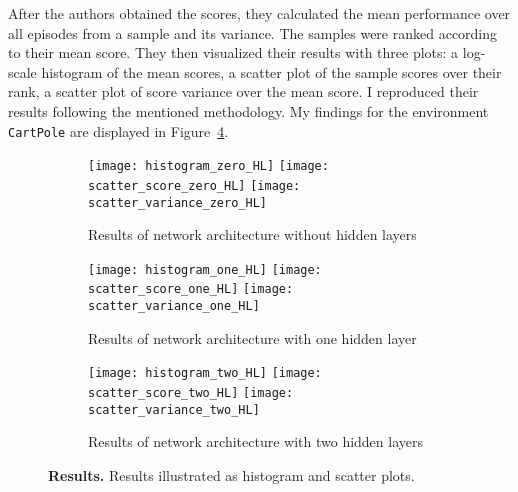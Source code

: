 After the authors obtained the scores, they calculated the mean performance over all episodes from a sample and its variance. The samples were ranked according to their mean score. They then visualized their results with three plots: a log-scale histogram of the mean scores, a scatter plot of the sample scores over their rank, a scatter plot of score variance over the mean score. I reproduced their results following the mentioned methodology. My findings for the environment \verb|CartPole| are displayed in Figure~\ref{fig:plots_reproduced}.

\begin{figure}[ht]
\centering
\begin{subfigure}{\textwidth}
  \centering
  \texttt{[image: histogram\_zero\_HL]}
  \texttt{[image: scatter\_score\_zero\_HL]}
  \texttt{[image: scatter\_variance\_zero\_HL]}
    \caption{Results of network architecture without hidden layers}
    \label{fig:plots_reproduced_first}
\end{subfigure}
\begin{subfigure}{\textwidth}
  \centering
  \texttt{[image: histogram\_one\_HL]}
  \texttt{[image: scatter\_score\_one\_HL]}
  \texttt{[image: scatter\_variance\_one\_HL]}
    \caption{Results of network architecture with one hidden layer}
    \label{fig:plots_reproduced_second}
\end{subfigure}
\begin{subfigure}{\textwidth}
  \centering
  \texttt{[image: histogram\_two\_HL]}
  \texttt{[image: scatter\_score\_two\_HL]}
  \texttt{[image: scatter\_variance\_two\_HL]}
    \caption{Results of network architecture with two hidden layers}
    \label{fig:plots_reproduced_third}
\end{subfigure}
\caption[Reproduced Plots]{
  \textbf{Results.}
  Results illustrated as histogram and scatter plots.
}
\label{fig:plots_reproduced}
\end{figure}


